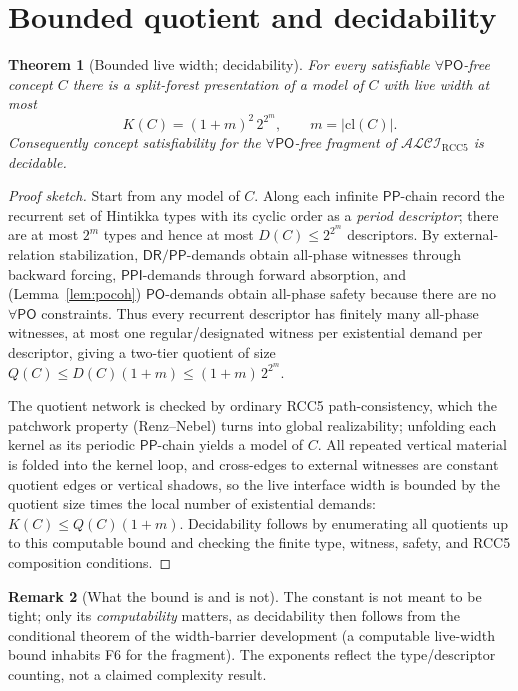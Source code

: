 \documentclass[11pt]{article}
\newcommand{\ALCIRCC}{\mathcal{ALCI}_{\mathrm{RCC5}}}
\newcommand{\DR}{\mathsf{DR}}
\newcommand{\PO}{\mathsf{PO}}
\newcommand{\PP}{\mathsf{PP}}
\newcommand{\PPI}{\mathsf{PPI}}
\newcommand{\cl}{\mathrm{cl}}
\theoremstyle{plain}
\newtheorem{theorem}{Theorem}
\theoremstyle{definition}
\newtheorem{remark}[theorem]{Remark}
\begin{document}
\section{Bounded quotient and decidability}

\begin{theorem}[Bounded live width; decidability]\label{thm:main}
For every satisfiable $\forall\PO$-free concept $C$ there is a
split-forest presentation of a model of $C$ with live width at most
\[
K(C)=(1+m)^2\,2^{2^m},\qquad m=|\cl(C)|.
\]
Consequently concept satisfiability for the $\forall\PO$-free fragment
of $\ALCIRCC$ is decidable.
\end{theorem}

\begin{proof}[Proof sketch]
Start from any model of $C$. Along each infinite $\PP$-chain record the
recurrent set of Hintikka types with its cyclic order as a
\emph{period descriptor}; there are at most $2^m$ types and hence at most
$D(C)\le 2^{2^m}$ descriptors. By external-relation stabilization,
$\DR/\PP$-demands obtain all-phase witnesses through backward forcing,
$\PPI$-demands through forward absorption, and (Lemma~\ref{lem:pocoh})
$\PO$-demands obtain all-phase safety because there are no $\forall\PO$
constraints. Thus every recurrent descriptor has finitely many all-phase
witnesses, at most one regular/designated witness per existential demand
per descriptor, giving a two-tier quotient of size
$Q(C)\le D(C)(1+m)\le(1+m)\,2^{2^m}$.

The quotient network is checked by ordinary RCC5 path-consistency, which
the patchwork property (Renz--Nebel) turns into global realizability;
unfolding each kernel as its periodic $\PP$-chain yields a model of $C$.
All repeated vertical material is folded into the kernel loop, and
cross-edges to external witnesses are constant quotient edges or
vertical shadows, so the live interface width is bounded by the quotient
size times the local number of existential demands:
$K(C)\le Q(C)(1+m)$. Decidability follows by enumerating all quotients
up to this computable bound and checking the finite type, witness,
safety, and RCC5 composition conditions.
\end{proof}

\begin{remark}[What the bound is and is not]
The constant is not meant to be tight; only its \emph{computability}
matters, as decidability then follows from the conditional theorem of
the width-barrier development (a computable live-width bound inhabits F6
for the fragment). The exponents reflect the type/descriptor counting,
not a claimed complexity result.
\end{remark}
\end{document}
